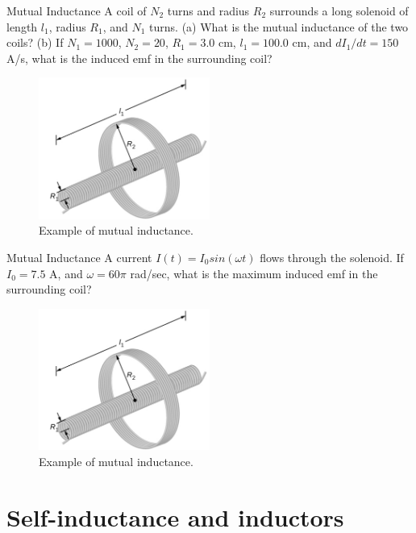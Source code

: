 \documentclass{beamer}
\begin{document}
\begin{frame}{Mutual Inductance}
\small
A coil of $N_2$ turns and radius $R_2$ surrounds a long solenoid of length $l_1$, radius $R_1$, and $N_1$ turns. (a) What is the mutual inductance of the two coils? (b) If $N_1 = 1000$, $N_2 = 20$, $R_1 = 3.0$ cm, $l_1 = 100.0$ cm, and $dI_1/dt = 150$ A/s, what is the induced emf in the surrounding coil?
\begin{figure}
\centering
\includegraphics[width=0.5\textwidth]{figures/ind2.png}
\caption{\label{fig:ind2} Example of mutual inductance.}
\end{figure}
\end{frame}

\begin{frame}{Mutual Inductance}
\small
A current $I(t) = I_0 sin (\omega t)$ flows through the solenoid.  If $I_0 = 7.5$ A, and $\omega = 60 \pi$ rad/sec, what is the maximum induced emf in the surrounding coil?
\begin{figure}
\centering
\includegraphics[width=0.5\textwidth]{figures/ind2.png}
\caption{\label{fig:ind3} Example of mutual inductance.}
\end{figure}
\end{frame}

\section{Self-inductance and inductors}
\end{document}
